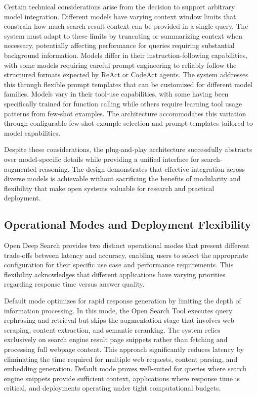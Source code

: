 Certain technical considerations arise from the decision to support arbitrary model integration. Different models have varying context window limits that constrain how much search result context can be provided in a single query. The system must adapt to these limits by truncating or summarizing context when necessary, potentially affecting performance for queries requiring substantial background information. Models differ in their instruction-following capabilities, with some models requiring careful prompt engineering to reliably follow the structured formats expected by ReAct or CodeAct agents. The system addresses this through flexible prompt templates that can be customized for different model families. Models vary in their tool-use capabilities, with some having been specifically trained for function calling while others require learning tool usage patterns from few-shot examples. The architecture accommodates this variation through configurable few-shot example selection and prompt templates tailored to model capabilities.

Despite these considerations, the plug-and-play architecture successfully abstracts over model-specific details while providing a unified interface for search-augmented reasoning. The design demonstrates that effective integration across diverse models is achievable without sacrificing the benefits of modularity and flexibility that make open systems valuable for research and practical deployment.

\subsection{Operational Modes and Deployment Flexibility}

Open Deep Search provides two distinct operational modes that present different trade-offs between latency and accuracy, enabling users to select the appropriate configuration for their specific use case and performance requirements. This flexibility acknowledges that different applications have varying priorities regarding response time versus answer quality.

Default mode optimizes for rapid response generation by limiting the depth of information processing. In this mode, the Open Search Tool executes query rephrasing and retrieval but skips the augmentation stage that involves web scraping, content extraction, and semantic reranking. The system relies exclusively on search engine result page snippets rather than fetching and processing full webpage content. This approach significantly reduces latency by eliminating the time required for multiple web requests, content parsing, and embedding generation. Default mode proves well-suited for queries where search engine snippets provide sufficient context, applications where response time is critical, and deployments operating under tight computational budgets.

